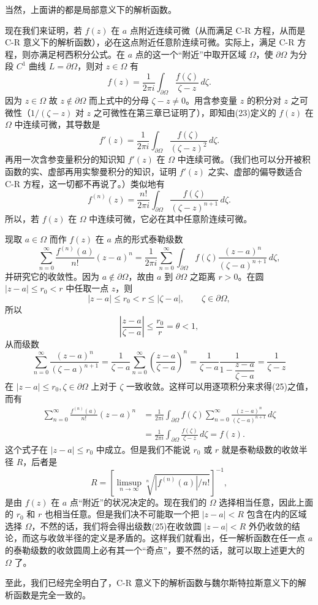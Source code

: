 当然，上面讲的都是局部意义下的解析函数。

现在我们来证明，若 $f(z)$ 在 $a$ 点附近连续可微（从而满足 C-R 方程，从而是 C-R 意义下的解析函数），必在这点附近任意阶连续可微。实际上，满足 C-R 方程，则亦满足柯西积分公式。在 $a$ 点的这一个“附近”中取开区域 $\Omega$，使 $\partial\Omega$ 为分段 $C^1$ 曲线 $L=\partial\Omega$，则对 $z\in\Omega$ 有
\begin{equation}
 f(z)=\frac1{2\pi i}\int_{\partial\Omega}\frac{f(\zeta)}{\zeta-z}\,d\zeta.
 \tag{23}
\end{equation}
因为 $z\in\Omega$ 故 $z\notin\partial\Omega$ 而上式中的分母 $\zeta-z\ne0$。用含参变量 $z$ 的积分对 $z$ 之可微性（$1/(\zeta-z)$ 对 $z$ 之可微性在第三章已证明了），即知由(23)定义的 $f(z)$ 在 $\Omega$ 中连续可微，其导数是
\[
 f'(z)=\frac1{2\pi i}\int_{\partial\Omega}\frac{f(\zeta)}{(\zeta-z)^2}\,d\zeta.
\]
再用一次含参变量积分的知识知 $f'(z)$ 在 $\Omega$ 中连续可微。（我们也可以分开被积函数的实、虚部再用实黎曼积分的知识，证明 $f'(z)$ 之实、虚部的偏导数适合 C-R 方程，这一切都不再说了。）类似地有
\begin{equation}
 f^{(n)}(z)=\frac{n!}{2\pi i}\int_{\partial\Omega}\frac{f(\zeta)}{(\zeta-z)^{n+1}}\,d\zeta.
 \tag{24}
\end{equation}
所以，若 $f(z)$ 在 $\Omega$ 中连续可微，它必在其中任意阶连续可微。

现取 $a\in\Omega$ 而作 $f(z)$ 在 $a$ 点的形式泰勒级数
\begin{equation}
 \sum_{n=0}^{\infty}\frac{f^{(n)}(a)}{n!}(z-a)^n
 =\frac1{2\pi i}\sum_{n=0}^{\infty}\int_{\partial\Omega}f(\zeta)
 \frac{(z-a)^n}{(\zeta-a)^{n+1}}\,d\zeta,
 \tag{25}
\end{equation}
并研究它的收敛性。因为 $a\notin\partial\Omega$，故由 $a$ 到 $\partial\Omega$ 之距离 $r>0$。在圆 $|z-a|\le r_0<r$ 中任取一点 $z$，则
\[
 |z-a|\le r_0<r\le|\zeta-a|,\qquad \zeta\in\partial\Omega,
\]
所以
\[
 \left|\frac{z-a}{\zeta-a}\right|\le\frac{r_0}{r}=\theta<1,
\]
从而级数
\[
 \sum_{n=0}^\infty\frac{(z-a)^n}{(\zeta-a)^{n+1}}
 =\frac1{\zeta-a}\sum_{n=0}^\infty\left(\frac{z-a}{\zeta-a}\right)^n
 =\frac1{\zeta-a}\frac1{1-\dfrac{z-a}{\zeta-a}}
 =\frac1{\zeta-z}
\]
在 $|z-a|\le r_0,\zeta\in\partial\Omega$ 上对于 $\zeta$ 一致收敛。这样可以用逐项积分来求得(25)之值，而有
\[
\begin{aligned}
 \sum_{n=0}^{\infty}\frac{f^{(n)}(a)}{n!}(z-a)^n
 &=\frac1{2\pi i}\int_{\partial\Omega}f(\zeta)
 \sum_{n=0}^{\infty}\frac{(z-a)^n}{(\zeta-a)^{n+1}}\,d\zeta\\
 &=\frac1{2\pi i}\int_{\partial\Omega}\frac{f(\zeta)}{\zeta-z}\,d\zeta=f(z).
\end{aligned}
\]
这个式子在 $|z-a|\le r_0$ 中成立。但是我们不能说 $r_0$ 或 $r$ 就是泰勒级数的收敛半径 $R$，后者是
\[
 R=\left[\limsup_{n\to\infty}\sqrt[n]{|f^{(n)}(a)|/n!}\right]^{-1},
\]
是由 $f(z)$ 在 $a$ 点“附近”的状况决定的。现在我们的 $\Omega$ 选择相当任意，因此上面的 $r_0$ 和 $r$ 也相当任意。但是我们决不可能取一个把 $|z-a|<R$ 包含在内的区域选择 $\Omega$，不然的话，我们将会得出级数(25)在收敛圆 $|z-a|<R$ 外仍收敛的结论，而这与收敛半径的定义是矛盾的。这样我们就看出，任一解析函数在任一点 $a$ 的泰勒级数的收敛圆周上必有其一个“奇点”，要不然的话，就可以取上述更大的 $\Omega$ 了。

至此，我们已经完全明白了，C-R 意义下的解析函数与魏尔斯特拉斯意义下的解析函数是完全一致的。
